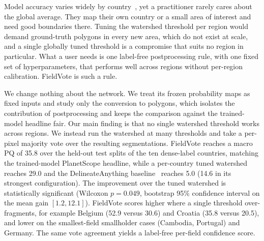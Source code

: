 \documentclass[conference]{IEEEtran}
\begin{document}
Model accuracy varies widely by country~\cite{kerner2024ftw,corley_ftp,ftw_global}, yet a practitioner rarely cares about the global average. They map their own country or a small area of interest and need good boundaries there. Tuning the watershed threshold per region would demand ground-truth polygons in every new area, which do not exist at scale, and a single globally tuned threshold is a compromise that suits no region in particular. What a user needs is one label-free postprocessing rule, with one fixed set of hyperparameters, that performs well across regions without per-region calibration. FieldVote is such a rule.

We change nothing about the network. We treat its frozen probability maps as fixed inputs and study only the conversion to polygons, which isolates the contribution of postprocessing and keeps the comparison against the trained-model headline fair. Our main finding is that no single watershed threshold works across regions. We instead run the watershed at many thresholds and take a per-pixel majority vote over the resulting segmentations. FieldVote reaches a macro PQ of 35.8 over the held-out test splits of the ten dense-label countries, matching the trained-model PlanetScope headline, while a per-country tuned watershed reaches 29.0 and the DelineateAnything baseline~\cite{lavreniuk2025delineateanything} reaches 5.0 (14.6 in its strongest configuration). The improvement over the tuned watershed is statistically significant (Wilcoxon $p = 0.049$, bootstrap 95\% confidence interval on the mean gain $[1.2, 12.1]$). FieldVote scores higher where a single threshold over-fragments, for example Belgium (52.9 versus 30.6) and Croatia (35.8 versus 20.5), and lower on the smallest-field smallholder cases (Cambodia, Portugal) and Germany. The same vote agreement yields a label-free per-field confidence score.
\end{document}
